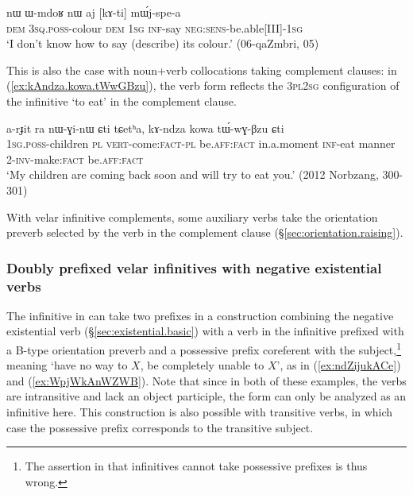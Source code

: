 \begin{exe}
\ex \label{ex:kAti.mWjspea}
\gll nɯ ɯ-mdoʁ nɯ aj [kɤ-ti] mɯ́j-spe-a \\
\textsc{dem} \textsc{3sq}.\textsc{poss}-colour \textsc{dem} \textsc{1sg} \textsc{inf}-say \textsc{neg}:\textsc{sens}-be.able[III]-\textsc{1sg} \\
\glt `I don't know how to say (describe) its colour.' (06-qaZmbri, 05)
  \end{exe} 
  
 This is also the case with noun+verb collocations taking complement clauses: in (\ref{ex:kAndza.kowa.tWwGBzu}), the verb form  reflects the \textsc{3pl}\fl{}\textsc{2sg} configuration of the infinitive  `to eat' in the complement clause. 
  
  \begin{exe}
\ex \label{ex:kAndza.kowa.tWwGBzu}
\gll   a-rɟit ra nɯ-ɣi-nɯ ɕti tɕetʰa, kɤ-ndza kowa tɯ́-wɣ-βzu ɕti \\
 \textsc{1sg}.\textsc{poss}-children \textsc{pl} \textsc{vert}-come:\textsc{fact}-\textsc{pl} be.\textsc{aff}:\textsc{fact} in.a.moment \textsc{inf}-eat manner 2-\textsc{inv}-make:\textsc{fact}  be.\textsc{aff}:\textsc{fact} \\
 \glt `My children are coming back soon and will try to eat you.' (2012 Norbzang, 300-301)
 \end{exe} 
 
With velar infinitive complements, some auxiliary verbs take the orientation preverb selected by the verb in the complement clause (§\ref{sec:orientation.raising}).
 

\subsubsection{Doubly prefixed velar infinitives with negative existential verbs} \label{sec:inf.exist}
The infinitive in  can take two prefixes in a construction combining the negative existential verb  (§\ref{sec:existential.basic}) with a verb in the infinitive prefixed with a B-type orientation preverb and a possessive prefix coreferent with the subject,\footnote{The assertion in \citet[228]{jacques16complementation} that infinitives cannot take possessive prefixes is thus wrong.} meaning `have no way to $X$, be completely unable to $X$', as in (\ref{ex:ndZijukACe}) and (\ref{ex:WpjWkAnWZWB}). Note that since in both of these examples, the verbs are intransitive and lack an object participle, the  form can only be analyzed as an infinitive here. This construction is also possible with transitive verbs, in which case the possessive prefix corresponds to the transitive subject.

